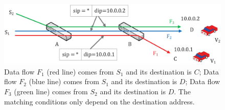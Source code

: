 %
%



\begin{figure} [t]
\begin{center}
\includegraphics[width=1\columnwidth]{figures/fig-6-31.eps}
\caption{Data flow $F_{1}$ (red line) comes from $S_{1}$ and its destination is $C$; Data flow $F_{2}$ (blue line) comes from $S_{1}$ and its destination is $D$; Data flow $F_{3}$ (green line) comes from $S_{2}$ and its destination is $D$. The matching conditions only depend on the destination address.} \label{fig6}
\end{center}
\vspace{-0.3in}
\end{figure}



